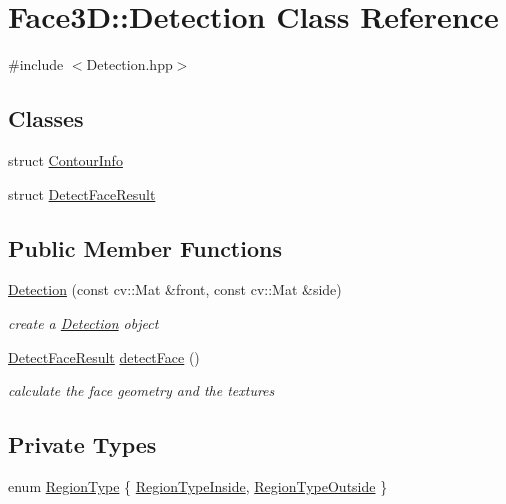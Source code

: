 \hypertarget{class_face3_d_1_1_detection}{}\section{Face3D\+:\+:Detection Class Reference}
\label{class_face3_d_1_1_detection}


{\ttfamily \#include $<$Detection.\+hpp$>$}

\subsection*{Classes}
\begin{DoxyCompactItemize}
\item 
struct \hyperlink{struct_face3_d_1_1_detection_1_1_contour_info}{Contour\+Info}
\item 
struct \hyperlink{struct_face3_d_1_1_detection_1_1_detect_face_result}{Detect\+Face\+Result}
\end{DoxyCompactItemize}
\subsection*{Public Member Functions}
\begin{DoxyCompactItemize}
\item 
\hyperlink{class_face3_d_1_1_detection_ab51a4a8e01db10e473fa38db9d77fd18}{Detection} (const cv\+::\+Mat \&front, const cv\+::\+Mat \&side)
\begin{DoxyCompactList}\small\item\em create a \hyperlink{class_face3_d_1_1_detection}{Detection} object \end{DoxyCompactList}\item 
\hyperlink{struct_face3_d_1_1_detection_1_1_detect_face_result}{Detect\+Face\+Result} \hyperlink{class_face3_d_1_1_detection_ac00b0ed49bbcc9efeccf307309b1723a}{detect\+Face} ()
\begin{DoxyCompactList}\small\item\em calculate the face geometry and the textures \end{DoxyCompactList}\end{DoxyCompactItemize}
\subsection*{Private Types}
\begin{DoxyCompactItemize}
\item 
enum \hyperlink{class_face3_d_1_1_detection_a8db79da2a4506aa0e799e4ff098d7d62}{Region\+Type} \{ \hyperlink{class_face3_d_1_1_detection_a8db79da2a4506aa0e799e4ff098d7d62a7714301dcaabe0757b2a1de73d08bf82}{Region\+Type\+Inside}, 
\hyperlink{class_face3_d_1_1_detection_a8db79da2a4506aa0e799e4ff098d7d62acdeffba67fe972b99a5a38bcde0061f3}{Region\+Type\+Outside}
 \}
\end{DoxyCompactItemize}
